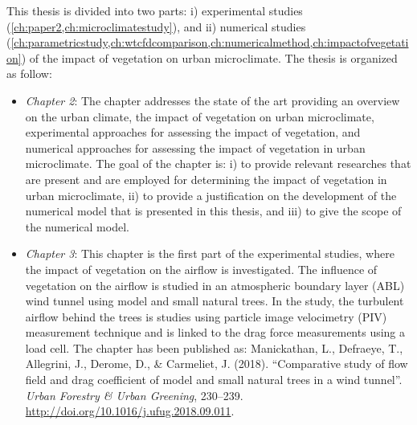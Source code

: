 This thesis is divided into two parts: i) experimental studies (\cref{ch:paper2,ch:microclimatestudy}), and ii) numerical studies (\cref{ch:parametricstudy,ch:wtcfdcomparison,ch:numericalmethod,ch:impactofvegetation}) of the impact of vegetation on urban microclimate. The thesis is organized as follow:
\begin{itemize}
	\item \textit{Chapter 2}: The chapter addresses the state of the art providing an overview on the urban climate, the impact of vegetation on urban microclimate, experimental approaches for assessing the impact of vegetation, and numerical approaches for assessing the impact of vegetation in urban microclimate. The goal of the chapter is: i) to provide relevant researches that are present and are employed for determining the impact of vegetation in urban microclimate, ii) to provide a justification on the development of the numerical model that is presented in this thesis, and iii) to give the scope of the numerical model. 

	\item \textit{Chapter 3}: This chapter is the first part of the experimental studies, where the impact of vegetation on the airflow is investigated. The influence of vegetation on the airflow is studied in an atmospheric boundary layer (ABL) wind tunnel using model and small natural trees. In the study, the turbulent airflow behind the trees is studies using particle image velocimetry (PIV) measurement technique and is linked to the drag force measurements using a load cell. The chapter has been published as: Manickathan, L., Defraeye, T., Allegrini, J., Derome, D., \& Carmeliet, J. (2018). ``Comparative study of flow field and drag coefficient of model and small natural trees in a wind tunnel''. \textit{Urban Forestry \& Urban Greening}, 230–239. \url{http://doi.org/10.1016/j.ufug.2018.09.011}.
	

\end{itemize}
